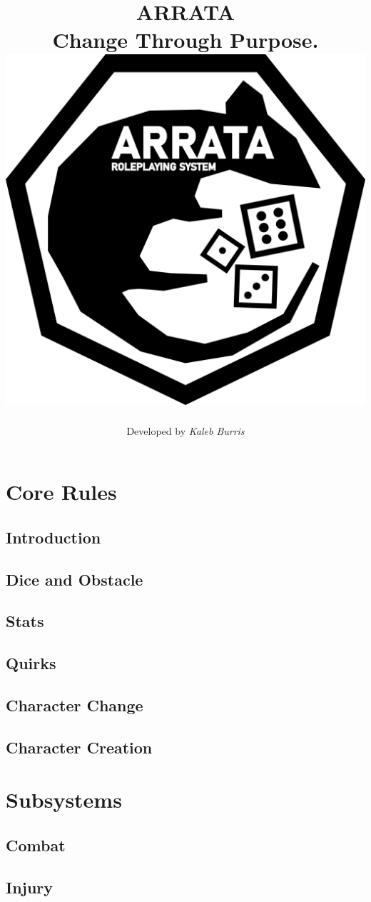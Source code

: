 \documentclass{book}
\title{
    \textbf{ARRATA} 
    \\
    \large Change Through Purpose.
    \\
    \includegraphics[width=\textwidth]{rat.png}
}
\date{}
\author{Developed by {\em Kaleb Burris}}
\begin{document}
    \maketitle

    \tableofcontents

    \part{Core Rules}

    \chapter{Introduction}
    

    \chapter{Dice and Obstacle}

    \chapter{Stats}

    \chapter{Quirks}

    \chapter{Character Change}

    \chapter{Character Creation}

    \part{Subsystems}

    \chapter{Combat}

    \chapter{Injury}
\end{document}

